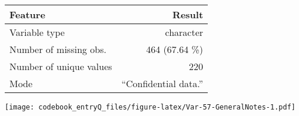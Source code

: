 \documentclass[]{article}
\newcommand{\bminione}{\begin{minipage}{0.75 \textwidth}}
\newcommand{\bminitwo}{\begin{minipage}{0.25 \textwidth}}
\newcommand{\emini}{\end{minipage}}
\begin{document}
\bminione

\begin{longtable}[]{@{}lr@{}}
\toprule
\begin{minipage}[b]{0.34\columnwidth}\raggedright\strut
Feature\strut
\end{minipage} & \begin{minipage}[b]{0.29\columnwidth}\raggedleft\strut
Result\strut
\end{minipage}\tabularnewline
\midrule
\endhead
\begin{minipage}[t]{0.34\columnwidth}\raggedright\strut
Variable type\strut
\end{minipage} & \begin{minipage}[t]{0.29\columnwidth}\raggedleft\strut
character\strut
\end{minipage}\tabularnewline
\begin{minipage}[t]{0.34\columnwidth}\raggedright\strut
Number of missing obs.\strut
\end{minipage} & \begin{minipage}[t]{0.29\columnwidth}\raggedleft\strut
464 (67.64 \%)\strut
\end{minipage}\tabularnewline
\begin{minipage}[t]{0.34\columnwidth}\raggedright\strut
Number of unique values\strut
\end{minipage} & \begin{minipage}[t]{0.29\columnwidth}\raggedleft\strut
220\strut
\end{minipage}\tabularnewline
\begin{minipage}[t]{0.34\columnwidth}\raggedright\strut
Mode\strut
\end{minipage} & \begin{minipage}[t]{0.29\columnwidth}\raggedleft\strut
``Confidential data.''\strut
\end{minipage}\tabularnewline
\bottomrule
\end{longtable}

\emini
\bminitwo
\texttt{[image: codebook\_entryQ\_files/figure-latex/Var-57-GeneralNotes-1.pdf]}
\emini
\end{document}
